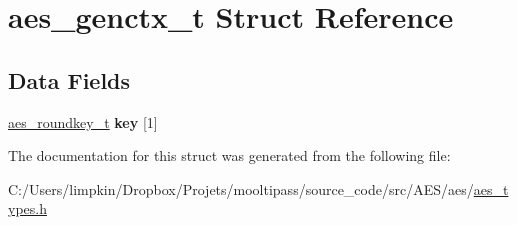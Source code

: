 \hypertarget{structaes__genctx__t}{\section{aes\-\_\-genctx\-\_\-t Struct Reference}
\label{structaes__genctx__t}
}
\subsection*{Data Fields}
\begin{DoxyCompactItemize}
\item 
\hypertarget{structaes__genctx__t_ad14597dc3319c5b64b7a5766962d1f5b}{\hyperlink{structaes__roundkey__t}{aes\-\_\-roundkey\-\_\-t} {\bfseries key} \mbox{[}1\mbox{]}}\label{structaes__genctx__t_ad14597dc3319c5b64b7a5766962d1f5b}

\end{DoxyCompactItemize}


The documentation for this struct was generated from the following file\-:\begin{DoxyCompactItemize}
\item 
C\-:/\-Users/limpkin/\-Dropbox/\-Projets/mooltipass/source\-\_\-code/src/\-A\-E\-S/aes/\hyperlink{aes__types_8h}{aes\-\_\-types.\-h}\end{DoxyCompactItemize}
